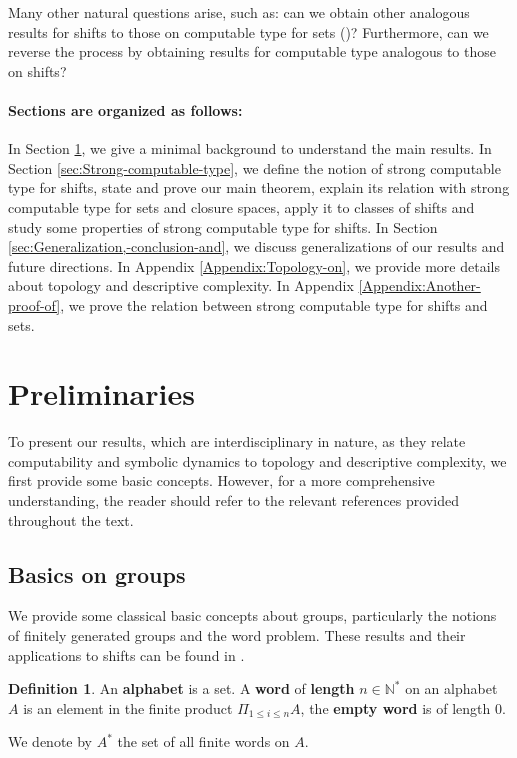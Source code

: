 \documentclass[french,american]{article}
\theoremstyle{plain}
\theoremstyle{definition}
\newtheorem{definition}[theorem]{Definition}
\theoremstyle{remark}
\theoremstyle{plain}
\begin{document}
Many other natural questions arise, such as: can we obtain other analogous
results for shifts to those on computable type for sets (\cite{Phdamir2024,AH22,AH22c,AH23,AMIR2024109020,AMIR2025103611,CCAinvitedAMIR,čačić2024computableapproximationssemicomputablegraphs,Čelar2021})?
Furthermore, can we reverse the process by obtaining results for computable
type analogous to those on shifts?

\paragraph*{Sections are organized as follows:}

In Section \ref{sec:Preliminaries}, we give a minimal background
to understand the main results. In Section \ref{sec:Strong-computable-type},
we define the notion of strong computable type for shifts, state and
prove our main theorem, explain its relation with strong computable
type for sets and closure spaces, apply it to classes of shifts and study some properties of strong computable type for shifts. In Section \ref{sec:Generalization,-conclusion-and},
we discuss generalizations of our results and future directions. In
Appendix \ref{Appendix:Topology-on}, we provide more details about
topology and descriptive complexity. In Appendix \ref{Appendix:Another-proof-of},
we prove the relation between strong computable type for shifts and
sets.

\section{Preliminaries}\label{sec:Preliminaries}

To present our results, which are interdisciplinary in nature, as
they relate computability and symbolic dynamics to topology and descriptive
complexity, we first provide some basic concepts. However, for a more
comprehensive understanding, the reader should refer to the relevant
references provided throughout the text.

\subsection{Basics on groups}

We provide some classical basic concepts about groups,
particularly the notions of finitely generated groups and the word
problem. These results and their applications to shifts can be found in \cite{aubrun2018domino}.
\begin{definition}
An \textbf{alphabet} is a set. A \textbf{word }of \textbf{length}
$n\in\mathbb{N}^{*}$ on an alphabet $A$ is an element in the finite
product $\Pi_{1\leq i\leq n}A$, the \textbf{empty word} is of length
$0$. 

We denote by $A^{*}$ the set of all finite words on $A$.
\end{definition}
\end{document}
